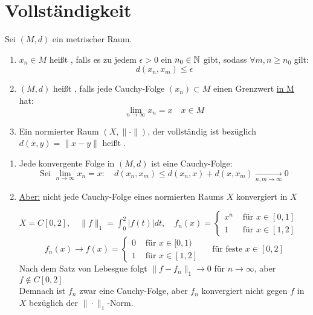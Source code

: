 


\section{Vollst{\"a}ndigkeit}



\begin{definition}
	Sei $(M, d)$ ein metrischer Raum.
	\begin{enumerate}[label=\alph*\upshape)]
		\item $x_{n} \in M$ hei{\ss}t , falls es zu jedem $\epsilon > 0$ ein $n_{0} \in \mathbb{N}$ gibt, sodass $\forall m, n \geq n_{0}$ gilt:
			\[ d(x_{n}, x_{m}) \leq \epsilon \]
		\item $(M, d)$ hei{\ss}t , falls jede Cauchy-Folge $(x_{n}) \subset M$ einen Grenzwert \uline{in M} hat:
			\[ \lim_{n \rightarrow \infty} x_{n} = x \quad x \in M \]
		\item Ein normierter Raum $(X, \| \cdot \|)$, der vollständig ist bezüglich $d(x, y) = \| x - y \|$ heißt .
	\end{enumerate}
\end{definition}


\begin{bemerkung}
	\begin{enumerate}[label=\alph*\upshape)]
		\item Jede konvergente Folge in $(M, d)$ ist eine Cauchy-Folge:
			\[ \text{Sei } \lim_{n \rightarrow \infty} x_{n} = x: \quad d(x_{n}, x_{m}) \leq d(x_{n}, x) + d(x, x_{m}) \xrightarrow[n, m \rightarrow \infty]{} 0 \]
		\item \uline{Aber:} nicht jede Cauchy-Folge eines normierten Raums $X$ konvergiert in $X$
			\begin{beispiel*}
				$X = C[0, 2], \quad \| f \|_{1} = \int_{0}^{2} | f(t) | dt, \quad
				f_{n}(x) = \begin{cases}x^{n} & \text{ für } x \in [0, 1] \\ 1 & \text{ für } x \in [1, 2]\end{cases}$	
				\[ f_{n}(x) \rightarrow f(x) = \begin{cases} 0 & \text{ für } x \in [0, 1) \\ 1 & \text{ für } x \in [1, 2] \end{cases} \quad \text{ für feste } x \in [0, 2] \]
				Nach dem Satz von Lebesgue folgt $\| f - f_{n} \|_{1} \rightarrow 0$ für $n \rightarrow \infty$, aber $f \notin C[0, 2]$ \\
				Demnach ist $f_{n}$ zwar eine Cauchy-Folge, aber $f_{n}$ konvergiert nicht gegen $f$ in $X$ bezüglich der $\| \cdot \|_{1}$-Norm.
			\end{beispiel*}
	\end{enumerate}	
\end{bemerkung}


